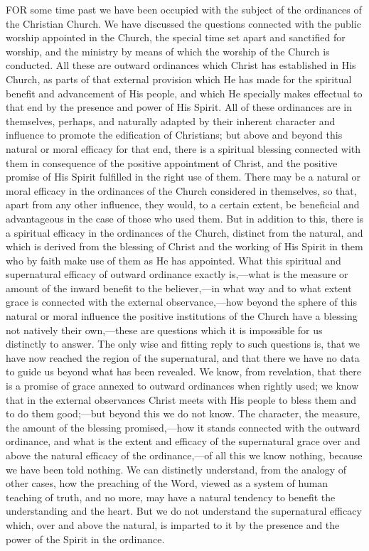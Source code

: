 \documentclass[]{book}
\begin{document}
FOR some time past we have been occupied with the subject of the ordinances of the Christian Church. We have discussed the questions connected with the public worship appointed in the Church, the special time set apart and sanctified for worship, and the ministry by means of which the worship of the Church is conducted. All these are outward ordinances which Christ has established in His Church, as parts of that external provision which He has made for the spiritual benefit and advancement of His people, and which He specially makes effectual to that end by the presence and power of His Spirit. All of these ordinances are in themselves, perhaps, and naturally adapted by their inherent character and influence to promote the edification of Christians; but above and beyond this natural or moral efficacy for that end, there is a spiritual blessing connected with them in consequence of the positive appointment of Christ, and the positive promise of His Spirit fulfilled in the right use of them. There may be a natural or moral efficacy in the ordinances of the Church considered in themselves, so that, apart from any other influence, they would, to a certain extent, be beneficial and advantageous in the case of those who used them. But in addition to this, there is a spiritual efficacy in the ordinances of the Church, distinct from the natural, and which is derived from the blessing of Christ and the working of His Spirit in them who by faith make use of them as He has appointed. What this spiritual and supernatural efficacy of outward ordinance exactly is,---what is the measure or amount of the inward benefit to the believer,---in what way and to what extent grace is connected with the external observance,---how beyond the sphere of this natural or moral influence the positive institutions of the Church have a blessing not natively their own,---these are questions which it is impossible for us distinctly to answer. The only wise and fitting reply to such questions is, that we have now reached the region of the supernatural, and that there we have no data to guide us beyond what has been revealed. We know, from revelation, that there is a promise of grace annexed to outward ordinances when rightly used; we know that in the external observances Christ meets with His people to bless them and to do them good;---but beyond this we do not know. The character, the measure, the amount of the blessing promised,---how it stands connected with the outward ordinance, and what is the extent and efficacy of the supernatural grace over and above the natural efficacy of the ordinance,---of all this we know nothing, because we have been told nothing. We can distinctly understand, from the analogy of other cases, how the preaching of the Word, viewed as a system of human teaching of truth, and no more, may have a natural tendency to benefit the understanding and the heart. But we do not understand the supernatural efficacy which, over and above the natural, is imparted to it by the presence and the power of the Spirit in the ordinance.
\end{document}

